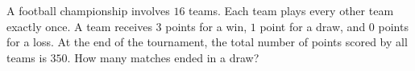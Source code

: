 A football championship involves $16$ teams. Each team plays every other team exactly once. A team receives $3$ points for a win, $1$ point for a draw, and $0$ points for a loss. At the end of the tournament, the total number of points scored by all teams is $350$. How many matches ended in a draw?
